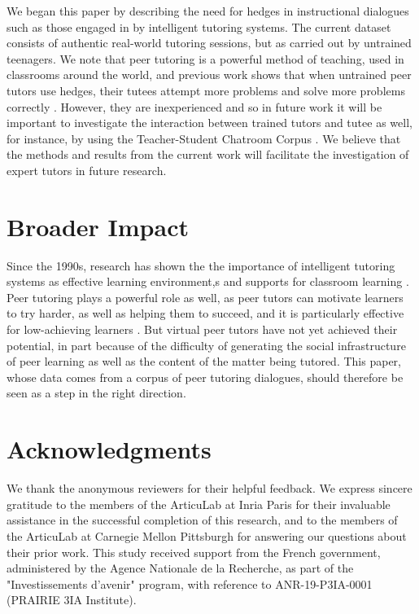 \documentclass[11pt]{article}
\begin{document}
We began this paper by describing the need for hedges in instructional dialogues such as those engaged in by intelligent tutoring systems. The current dataset consists of authentic real-world tutoring sessions, but as carried out by untrained teenagers. We note that peer tutoring is a powerful method of teaching, used in classrooms around the world, and previous work shows that when untrained peer tutors use hedges, their tutees attempt more problems and solve more problems correctly \citep{madaio2017impact}. However, they are inexperienced and so in future work it will be important to investigate the interaction between trained tutors and tutee as well, for instance, by using the Teacher-Student Chatroom Corpus \citep{caines2020teacher}.  We believe that the methods and results from the current work will facilitate the investigation of expert tutors in future research.


\section*{Broader Impact}
Since the 1990s, research has shown the the importance of intelligent tutoring systems as effective learning environment,s and supports for classroom learning \citep{anderson1995cognitive}. Peer tutoring plays a powerful role as well, as peer tutors can motivate learners to try harder, as well as helping them to succeed, and it is particularly effective for low-achieving learners \citep{cassell2022socially}. But virtual peer tutors have not yet achieved their potential, in part because of the difficulty of generating the social infrastructure of peer learning as well as the content of the matter being tutored. This paper, whose data comes from a corpus of peer tutoring dialogues, should therefore be seen as a step in the right direction. 

\section*{Acknowledgments}
We thank the anonymous reviewers for their helpful
feedback. We express sincere gratitude to the members of the ArticuLab at Inria Paris for their invaluable assistance in the successful completion of this research, and to the members of the ArticuLab at Carnegie Mellon Pittsburgh for answering our questions about their prior work. This study received support from the French government, administered by the Agence Nationale de la Recherche, as part of the "Investissements d'avenir" program, with reference to ANR-19-P3IA-0001 (PRAIRIE 3IA Institute).
\end{document}
